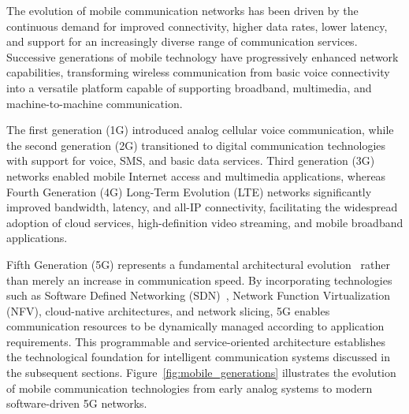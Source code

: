 \documentclass[12pt,a4paper]{report}
\begin{document}
The evolution of mobile communication networks has been driven by the continuous demand for improved connectivity, higher data rates, lower latency, and support for an increasingly diverse range of communication services. Successive generations of mobile technology have progressively enhanced network capabilities, transforming wireless communication from basic voice connectivity into a versatile platform capable of supporting broadband, multimedia, and machine-to-machine communication.

The first generation (1G) introduced analog cellular voice communication, while the second generation (2G) transitioned to digital communication technologies with support for voice, SMS, and basic data services. Third generation (3G) networks enabled mobile Internet access and multimedia applications, whereas Fourth Generation (4G) Long-Term Evolution (LTE) networks significantly improved bandwidth, latency, and all-IP connectivity, facilitating the widespread adoption of cloud services, high-definition video streaming, and mobile broadband applications.

Fifth Generation (5G) represents a fundamental architectural evolution~\cite{shafi20175g, chataut2020massive} rather than merely an increase in communication speed. By incorporating technologies such as Software Defined Networking (SDN)~\cite{kreutz2015software, mckeown2008openflow}, Network Function Virtualization (NFV), cloud-native architectures, and network slicing, 5G enables communication resources to be dynamically managed according to application requirements. This programmable and service-oriented architecture establishes the technological foundation for intelligent communication systems discussed in the subsequent sections. Figure~\ref{fig:mobile_generations} illustrates the evolution of mobile communication technologies from early analog systems to modern software-driven 5G networks.
\end{document}
